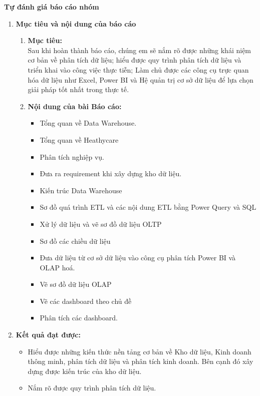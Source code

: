 \bigskip
\newpage
\fontsize{22pt}{16pt}\selectfont
\begin{center}
    {\bfseries Tự đánh giá báo cáo nhóm}
\end{center}
\fontsize{13pt}{16pt}\selectfont
\bigskip
\begin{enumerate}
    \item \textbf{Mục tiêu và nội dung của báo cáo}
\begin{enumerate}
    \item \textbf{Mục tiêu:}\\
Sau khi hoàn thành báo cáo, chúng em sẽ nắm rõ được những khái niệm cơ bản về phân tích dữ liệu; hiểu được quy trình phân tích dữ liệu và triển khai vào công việc thực tiễn; Làm chủ được các công cụ trực quan hóa dữ liệu như Excel, Power BI và Hệ quản trị cơ sở dữ liệu để lựa chọn giải pháp tốt nhất trong thực tế.
\item \textbf{Nội dung của bài Báo cáo:}
\begin{itemize}[label=$-$]
    \item Tổng quan về Data Warehouse.
    \item Tổng quan về Heathycare
    \item Phân tích nghiệp vụ.
    \item Đưa ra requirement khi xây dựng kho dữ liệu.
    \item Kiến trúc Data Warehouse
    \item  Sơ đồ quá trình ETL và các nội dung ETL bằng Power Query và SQL
    \item Xử lý dữ liệu và vẽ sơ đồ dữ liệu OLTP
    \item  Sơ đồ các chiều dữ liệu
    \item Đưa dữ liệu từ cơ sở dữ liệu vào công cụ phân tích Power BI và OLAP hoá.
    \item Vẽ sơ đồ dữ liệu OLAP
    \item  Vẽ các dashboard theo chủ đề
    \item Phân tích các dashboard.
\end{itemize}
\end{enumerate}
\item \textbf{Kết quả đạt được:}
\begin{itemize}[label=$-$]
    \item  Hiểu được những kiến thức nền tảng cơ bản về Kho dữ liệu, Kinh doanh
thông minh, phân tích dữ liệu và phân tích kinh doanh. Bên cạnh đó xây dựng được kiến trúc của kho dữ liệu.
    \item  Nắm rõ được quy trình phân tích dữ liệu.

\end{itemize}
\end{enumerate}
